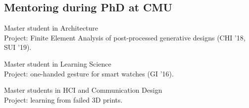 %
%
%
%
%
%

\subsection{Mentoring during PhD at CMU}
 {
	 {
		Master student in Architecture\\
		Project: Finite Element Analysis of post-processed generative designs (CHI '18, SUI '19).
	}
}

 {
	 {
		Master student in Learning Science\\
		Project: one-handed gesture for smart watches (GI '16).
	}
}

 {
	 {
		Master students in HCI and Communication Design\\
		Project: learning from failed 3D prints.
	}
}